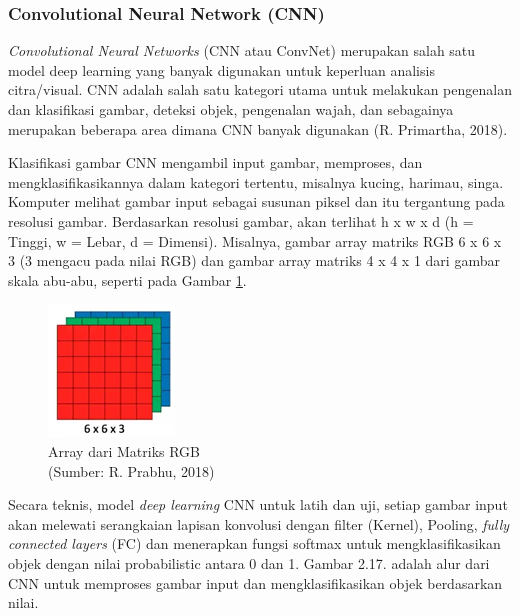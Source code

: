 \subsubsection{Convolutional Neural Network (CNN)}
\hspace{1,2cm}\textit{Convolutional Neural Networks} (CNN atau ConvNet) merupakan salah satu model deep learning yang banyak digunakan untuk keperluan analisis citra/visual. CNN adalah salah satu kategori utama untuk melakukan pengenalan dan klasifikasi gambar, deteksi objek, pengenalan wajah, dan sebagainya merupakan beberapa area dimana CNN banyak digunakan (R. Primartha, 2018).

Klasifikasi gambar CNN mengambil input gambar, memproses, dan mengklasifikasikannya dalam kategori tertentu, misalnya kucing, harimau, singa. Komputer melihat gambar input sebagai susunan piksel dan itu tergantung pada resolusi gambar. Berdasarkan resolusi gambar, akan terlihat h x w x d (h = Tinggi, w = Lebar, d = Dimensi). Misalnya, gambar array matriks RGB 6 x 6 x 3 (3 mengacu pada nilai RGB) dan gambar array matriks 4 x 4 x 1 dari gambar skala abu-abu, seperti pada Gambar \ref{img:Array-Matriks-RGB}.

\begin{figure}[H]
	\vspace{-0.1cm}
	\begin{center}
		\includegraphics[width=0.3\columnwidth]{bab2/Gambar/Picture16.png}
	\end{center}
	\vspace{-0.2cm}
	\captionsetup{justification=centering}
	\caption{Array dari Matriks RGB\\(Sumber: R. Prabhu, 2018)}\label{img:Array-Matriks-RGB}
\end{figure}

Secara teknis, model \textit{deep learning} CNN untuk latih dan uji, setiap gambar input akan melewati serangkaian lapisan konvolusi dengan filter (Kernel), Pooling, \textit{fully connected layers} (FC) dan menerapkan fungsi softmax untuk mengklasifikasikan objek dengan nilai probabilistic antara 0 dan 1. Gambar 2.17. adalah alur dari CNN untuk memproses gambar input dan mengklasifikasikan objek berdasarkan nilai.


